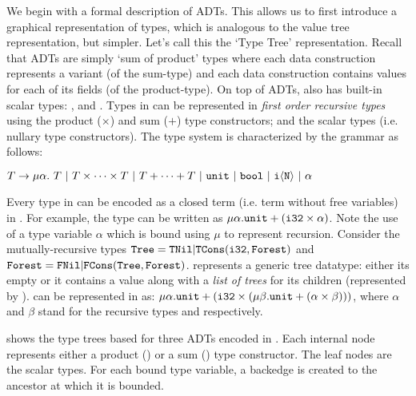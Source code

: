 We begin with a formal description of ADTs.
This allows us to first introduce a graphical representation of types, which is analogous to the value tree representation, but simpler.
Let's call this the `Type Tree' representation.
Recall that ADTs are simply `sum of product' types where each data construction represents a variant (of the sum-type) and
each data construction contains values for each of its fields (of the product-type).
On top of ADTs, \SpecL{} also has built-in scalar types: ,  and .
Types in \SpecL{} can be represented in {\em first order recursive types} using the product ($\times$) and sum ($+$) type
constructors; and the scalar types (i.e. nullary type constructors).
The type system is characterized by the grammar \typegrammar{} as follows:

$T \rightarrow \mu \alpha. \ T \ |\ T \times \dots \times T \ |\  T + \dots + T \ |\  \type{unit} \ |\ \type{bool} \ |\  \type{i\langle N \rangle} \ |\ \alpha$

Every type in \SpecL{} can be encoded as a closed term (i.e. term without free variables) in \typegrammar{}.
For example, the  type can be written as $\mu \alpha. {\tt unit} + ({\tt i32} \times \alpha)$.
Note the use of a type variable $\alpha$ which is bound using $\mu$ to represent recursion.
Consider the mutually-recursive types ${\tt Tree} = {\tt TNil} | {\tt TCons}({\tt i32}, {\tt Forest})$
and ${\tt Forest} = {\tt FNil} | {\tt FCons}({\tt Tree}, {\tt Forest})$.
 represents a generic  tree datatype: either its empty or it contains
a value along with a {\em list of trees} for its children (represented by ).
 can be represented in \typegrammar{} as:
$\mu \alpha. {\tt unit} + ({\tt i32} \times (\mu \beta. {\tt unit + (\alpha \times \beta)}))$,
where $\alpha$ and $\beta$ stand for the recursive types  and  respectively.



 shows the type trees based for three \SpecL{} ADTs encoded in \typegrammar{}.
Each internal node represents either a product (\circled{$\times$}) or a sum (\circled{$+$}) type constructor.
The leaf nodes are the scalar types.
For each bound type variable, a backedge is created to the ancestor at which it is bounded.



